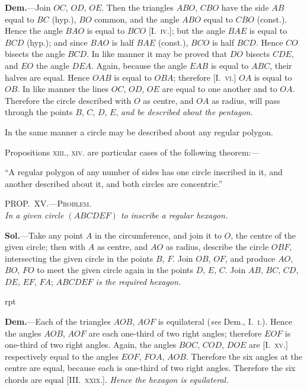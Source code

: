 \documentclass[oneside]{book}
\newcommand\myprop[2]{
\bigskip\Needspace*{4\baselineskip}\begin{center}\textsc{#1}\\\medskip\emph{#2}\par\end{center}
}
\newcommand\imgflow[3]{
\setcounter{wrapwidth}{#1}
\begin{wrapfigure}[#2]{r}{\value{wrapwidth}pt}
\begin{center}
\vspace{-0.3in}
\end{center}
\end{wrapfigure}
}
\begin{document}
\textbf{Dem.}---Join $OC$, $OD$, $OE$. Then the triangles\label{traingles} $ABO$,
$CBO$ have the side $AB$ equal to
$BC$ (hyp.), $BO$ common, and the
angle $ABO$ equal to $CBO$ (const.).
Hence the angle $BAO$ is equal to
$BCO$ [\textsc{I.~iv.}]; but the angle $BAE$
is equal to $BCD$ (hyp.); and since
$BAO$ is half $BAE$ (const.), $BCO$
is half $BCD$. Hence $CO$ bisects
the angle $BCD$. In like manner
it may be proved that $DO$ bisects
$CDE$, and $EO$ the angle $DEA$. Again, because the
angle $EAB$ is equal to $ABC$, their halves are equal.
Hence $OAB$ is equal to $OBA$; therefore [\textsc{I.~vi.}] $OA$ is
equal to $OB$. In like manner the lines $OC$, $OD$, $OE$
are equal to one another and to $OA$. Therefore the
circle described with $O$ as centre, and $OA$ as radius,
will pass through the points $B$, $C$, $D$, $E$, \emph{and be described
about the pentagon.}

In the same manner a circle may be described about
any regular polygon.\par\smallskip


\begin{footnotesize}
Propositions \textsc{xiii.}, \textsc{xiv.} are particular cases of the following
theorem:---

``A regular polygon of any number of sides has one circle inscribed
in it, and another described about it, and both circles are
concentric.''
\end{footnotesize}

\myprop{PROP\@.~XV\@.---Problem.}{In a given circle $(ABCDEF)$ to inscribe a regular hexagon.}

\textbf{Sol.}---Take any point $A$ in the circumference, and
join it to $O$, the centre
of the given circle; then
with $A$ as centre, and $AO$
as radius, describe the
circle $OBF$, intersecting
the given circle in the
points $B$, $F$. Join $OB$,
$OF$, and produce $AO$, $BO$,
$FO$ to meet the given
circle again in the points $D$, $E$, $C$. Join $AB$, $BC$, $CD$,
$DE$, $EF$, $FA$; \emph{$ABCDEF$ is the required hexagon.}

\imgflow{156}{8}{f167}

\textbf{Dem.}---Each of the triangles $AOB$, $AOF$ is equilateral
(\emph{see} Dem., \textsc{I.~i.}). Hence the angles $AOB$, $AOF$
are each one-third of two right angles; therefore $EOF$
is one-third of two right angles. Again, the angles
$BOC$, $COD$, $DOE$ are [\textsc{I.~xv.}] respectively equal to the
angles $EOF$, $FOA$, $AOB$. Therefore the six angles at
the centre are equal, because each is one-third of two
right angles. Therefore the six chords are equal [\textsc{III\@.~xxix.}].
\emph{Hence the hexagon is equilateral.}
\end{document}
